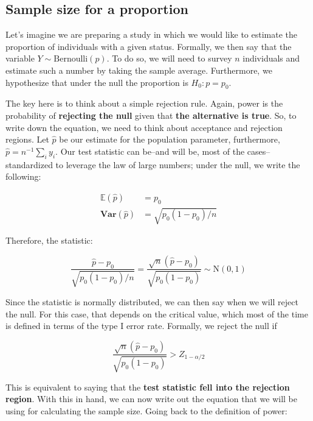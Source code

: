 \documentclass[]{book}
\begin{document}
\hypertarget{sample-size-for-a-proportion}{%
\subsection{Sample size for a proportion}\label{sample-size-for-a-proportion}}

Let's imagine we are preparing a study in which we would like to estimate the proportion of individuals with a given status. Formally, we then say that the variable \(Y\sim\mbox{Bernoulli}(p)\). To do so, we will need to survey \(n\) individuals and estimate such a number by taking the sample average. Furthermore, we hypothesize that under the null the proportion is \(H_0: p = p_0\).

The key here is to think about a simple rejection rule. Again, power is the probability of \textbf{rejecting the null} given that \textbf{the alternative is true}. So, to write down the equation, we need to think about acceptance and rejection regions. Let \(\hat p\) be our estimate for the population parameter, furthermore, \(\hat p = n^{-1}\sum_i y_i\). Our test statistic can be--and will be, most of the cases--standardized to leverage the law of large numbers; under the null, we write the following:

\begin{align*}
\mathbb{E}(\hat p) & = p_0 \\
\mathbf{Var}(\hat p) & = \sqrt{p_0(1-p_0)/n}
\end{align*}

Therefore, the statistic:

\begin{equation*}
\frac{\hat p - p_0}{\sqrt{p_0(1-p_0)/n}} = \frac{\sqrt{n}(\hat p - p_0)}{\sqrt{p_0(1-p_0)}} \sim \mbox{N}(0, 1)
\end{equation*}

Since the statistic is normally distributed, we can then say when we will reject the null. For this case, that depends on the critical value, which most of the time is defined in terms of the type I error rate. Formally, we reject the null if

\begin{equation*}
\frac{\sqrt{n}(\hat p - p_0)}{\sqrt{p_0(1-p_0)}} > Z_{1-\alpha/2}
\end{equation*}

This is equivalent to saying that the \textbf{test statistic fell into the rejection region}. With this in hand, we can now write out the equation that we will be using for calculating the sample size. Going back to the definition of power:
\end{document}
